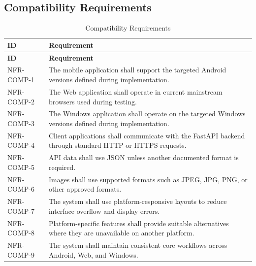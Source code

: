 \subsection{Compatibility Requirements}
\begin{longtable}{@{}p{2.6cm}p{10.8cm}@{}}
\caption{Compatibility Requirements} \label{tab:nfr-comp} \\
\toprule \textbf{ID} & \textbf{Requirement} \\ \midrule
\endfirsthead
\toprule \textbf{ID} & \textbf{Requirement} \\ \midrule
\endhead
NFR-COMP-1 & The mobile application shall support the targeted Android versions defined during implementation. \\
NFR-COMP-2 & The Web application shall operate in current mainstream browsers used during testing. \\
NFR-COMP-3 & The Windows application shall operate on the targeted Windows versions defined during implementation. \\
NFR-COMP-4 & Client applications shall communicate with the FastAPI backend through standard HTTP or HTTPS requests. \\
NFR-COMP-5 & API data shall use JSON unless another documented format is required. \\
NFR-COMP-6 & Images shall use supported formats such as JPEG, JPG, PNG, or other approved formats. \\
NFR-COMP-7 & The system shall use platform-responsive layouts to reduce interface overflow and display errors. \\
NFR-COMP-8 & Platform-specific features shall provide suitable alternatives where they are unavailable on another platform. \\
NFR-COMP-9 & The system shall maintain consistent core workflows across Android, Web, and Windows. \\
\bottomrule
\end{longtable}

